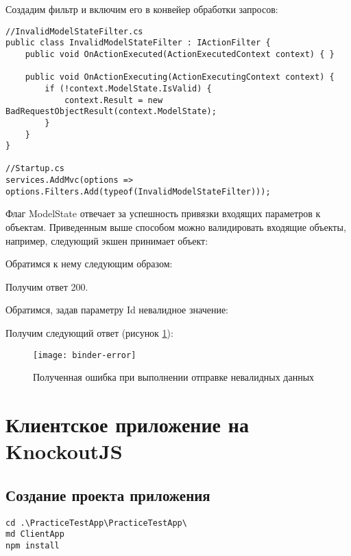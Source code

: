 \documentclass[a4paper,14pt]{extarticle}
\begin{document}
Создадим фильтр и включим его в конвейер обработки запросов:

\begin{lstlisting}
//InvalidModelStateFilter.cs
public class InvalidModelStateFilter : IActionFilter {
    public void OnActionExecuted(ActionExecutedContext context) { }

    public void OnActionExecuting(ActionExecutingContext context) {
        if (!context.ModelState.IsValid) {
            context.Result = new BadRequestObjectResult(context.ModelState);
        }
    }
}

//Startup.cs
services.AddMvc(options => options.Filters.Add(typeof(InvalidModelStateFilter)));
\end{lstlisting}

Флаг ModelState отвечает за успешность привязки входящих параметров к объектам.
Приведенным выше способом можно валидировать входящие объекты, например, следующий
экшен принимает объект:


Обратимся к нему следующим образом:


Получим ответ 200.

Обратимся, задав параметру Id невалидное значение:


Получим следующий ответ (рисунок \ref{fig:binder-error}):

\begin{figure}[H]
    \centering
    \texttt{[image: binder-error]}
    \caption{Полученная ошибка при выполнении отправке невалидных данных}
    \label{fig:binder-error}
\end{figure}

\section{Клиентское приложение на KnockoutJS}

\subsection{Создание проекта приложения}

\begin{lstlisting}
cd .\PracticeTestApp\PracticeTestApp\
md ClientApp
npm install
\end{lstlisting}
\end{document}
